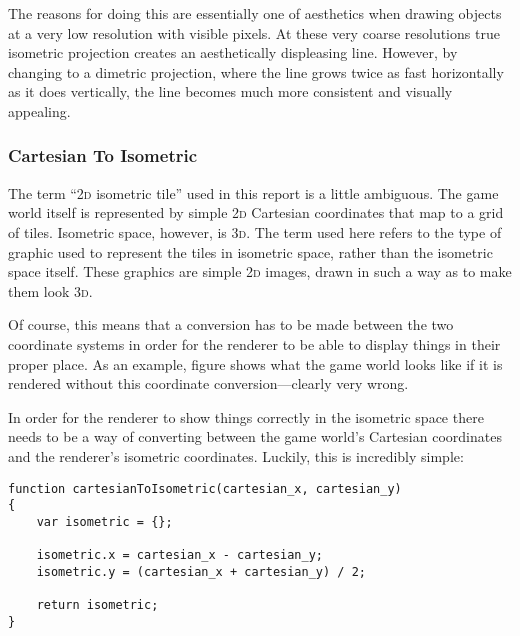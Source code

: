 The reasons for doing this are essentially one of aesthetics when drawing objects at a very low resolution with visible pixels. At these very coarse resolutions true isometric projection creates an aesthetically displeasing line. However, by changing to a dimetric projection, where the line grows twice as fast horizontally as it does vertically, the line becomes much more consistent and visually appealing. 

\subsubsection{Cartesian To Isometric}
The term ``\textsc{2d} isometric tile'' used in this report is a little ambiguous. The game world itself is represented by simple \textsc{2d} Cartesian coordinates that map to a grid of tiles. Isometric space, however, is \textsc{3d}. The term used here refers to the type of graphic used to represent the tiles in isometric space, rather than the isometric space itself. These graphics are simple \textsc{2d} images, drawn in such a way as to make them look \textsc{3d}. 

Of course, this means that a conversion has to be made between the two coordinate systems in order for the renderer to be able to display things in their proper place. As an example, figure  shows what the game world looks like if it is rendered without this coordinate conversion---clearly very wrong.

In order for the renderer to show things correctly in the isometric space there needs to be a way of converting between the game world's Cartesian coordinates and the renderer's isometric coordinates. Luckily, this is incredibly simple:

\noindent
\begin{minipage}{\linewidth}
\begin{lstlisting}[style=js, caption={JavaScript implementation of a function to turn Cartesian coordinates into game isometric coordinates. Original algorithm from \cite{citeulike:13155325}.}, label=cartesian_to_isometric]
function cartesianToIsometric(cartesian_x, cartesian_y)
{
	var isometric = {};

    isometric.x = cartesian_x - cartesian_y;
    isometric.y = (cartesian_x + cartesian_y) / 2;

    return isometric;
}
\end{lstlisting}
\end{minipage}

